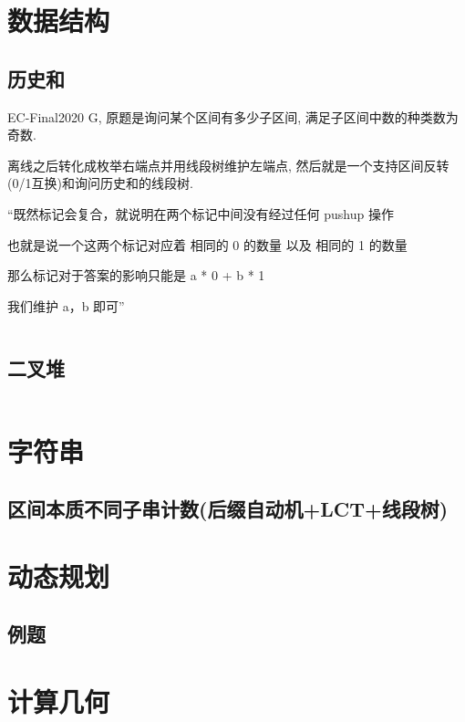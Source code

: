 \documentclass[a4paper]{article}
\begin{document}
\begin{multicols}{2}
		\section{数据结构}
			\subsection{历史和}

				EC-Final2020 G, 原题是询问某个区间有多少子区间, 满足子区间中数的种类数为奇数.

				离线之后转化成枚举右端点并用线段树维护左端点, 然后就是一个支持区间反转(0/1互换)和询问历史和的线段树.

				``既然标记会复合，就说明在两个标记中间没有经过任何 pushup 操作

				也就是说一个这两个标记对应着 相同的 0 的数量 以及 相同的 1 的数量

				那么标记对于答案的影响只能是 a * 0 + b * 1

				我们维护 a，b 即可''

				\inputminted{cpp}{../src/datastructure/ec20g.cpp}
			
			\subsection{二叉堆}
				\inputminted{cpp}{../src/datastructure/二叉堆.cpp}

		\section{字符串}
			\subsection[区间本质不同子串计数]{区间本质不同子串计数(后缀自动机+LCT+线段树)}
				

		\section{动态规划}
			
			\subsection{例题}
				

		\section{计算几何}
			

\end{multicols}
\end{document}
